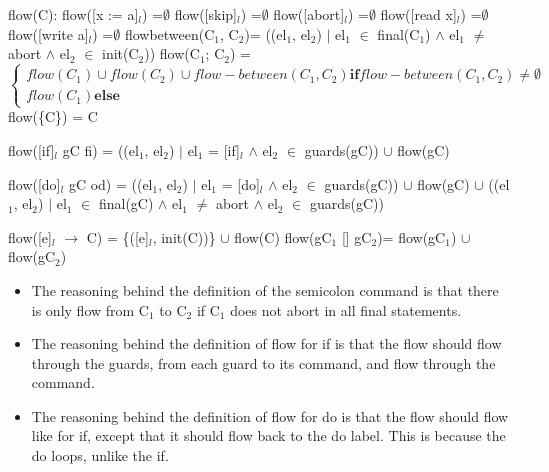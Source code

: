 flow(C):\newline
flow([x := a]$_l$)        =$\emptyset$\newline
flow([skip]$_l$)          =$\emptyset$\newline
flow([abort]$_l$)         =$\emptyset$\newline
flow([read x]$_l$)        =$\emptyset$\newline
flow([write a]$_l$)       =$\emptyset$\newline
flow\-between(C$_1$, C$_2$)= ((el$_1$, el$_2$) $\vert$ el$_1$ $\in$ final(C$_1$) $\wedge$ el$_1$ $\neq$ abort $\wedge$ el$_2$ $\in$ init(C$_2$))\newline
flow(C$_1$; C$_2$)		 = 
\begin{equation}
\begin{cases}
flow(C_1) \cup flow(C_2) \cup flow-between(C_1, C_2) \textbf{if} flow-between(C_1, C_2) \not = \emptyset\\
flow(C_1) \textbf{else}
\end{cases}
\end{equation}\newline
flow(\{C\}) = C\newline

flow([if]$_l$ gC fi) = ((el$_1$, el$_2$) $\vert$ el$_1$ = [if]$_l$ $\wedge$ el$_2$ $\in$ guards(gC))\newline
$\cup$ flow(gC)\newline

flow([do]$_l$ gC od) = ((el$_1$, el$_2$) $\vert$ el$_1$ = [do]$_l$ $\wedge$ el$_2$ $\in$ guards(gC))\newline
$\cup$ flow(gC)\newline
$\cup$ ((el$_1$, el$_2$) $\vert$ el$_1$ $\in$ final(gC) $\wedge$ el$_1$ $\neq$ abort $\wedge$ el$_2$ $\in$ guards(gC))\newline

flow([e]$_l$ $\to$ C)      = \{([e]$_l$, init(C))\} $\cup$ flow(C) \newline
flow(gC$_1$ [] gC$_2$)= flow(gC$_1$) $\cup$ flow(gC$_2$)\newline


\begin{itemize}
\item The reasoning behind the definition of the semicolon command is that there
is only flow from C$_1$ to C$_2$ if C$_1$ does not abort in all final statements.
\item The reasoning behind the definition of flow for if is that the flow should
flow through the guards, from each guard to its command, and flow through the command.
\item The reasoning behind the definition of flow for do is that the flow should flow
like for if, except that it should flow back to the do label. This is because the do loops,
unlike the if.
\end{itemize}

